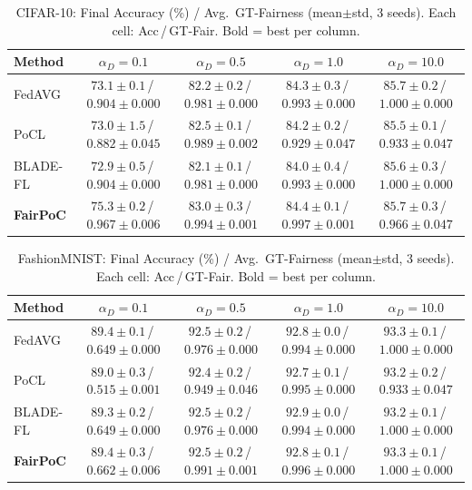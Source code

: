 \documentclass[journal]{IEEEtran}
\theoremstyle{definition}
\theoremstyle{remark}
\begin{document}
\begin{table}[t]
\caption{CIFAR-10: Final Accuracy (\%) / Avg.\ GT-Fairness (mean$\pm$std,
3 seeds). Each cell: Acc\,/\,GT-Fair. Bold = best per column.}
\label{tab:cifar10}
\centering
\renewcommand{\arraystretch}{1.15}
\setlength{\tabcolsep}{3pt}
\footnotesize
\begin{tabular}{lcccc}
\toprule
\textbf{Method} & $\alpha_D{=}0.1$ & $\alpha_D{=}0.5$ & $\alpha_D{=}1.0$ & $\alpha_D{=}10.0$ \\
\midrule
FedAVG   & $73.1{\pm}0.1$\,/\,$0.904{\pm}0.000$ & $82.2{\pm}0.2$\,/\,$0.981{\pm}0.000$ & $84.3{\pm}0.3$\,/\,$0.993{\pm}0.000$ & $\mathbf{85.7{\pm}0.2}$\,/\,$\mathbf{1.000{\pm}0.000}$ \\
PoCL     & $73.0{\pm}1.5$\,/\,$0.882{\pm}0.045$ & $82.5{\pm}0.1$\,/\,$0.989{\pm}0.002$ & $84.2{\pm}0.2$\,/\,$0.929{\pm}0.047$ & $85.5{\pm}0.1$\,/\,$0.933{\pm}0.047$ \\
BLADE-FL & $72.9{\pm}0.5$\,/\,$0.904{\pm}0.000$ & $82.1{\pm}0.1$\,/\,$0.981{\pm}0.000$ & $84.0{\pm}0.4$\,/\,$0.993{\pm}0.000$ & $85.6{\pm}0.3$\,/\,$1.000{\pm}0.000$ \\
\textbf{FairPoC} & $\mathbf{75.3{\pm}0.2}$\,/\,$\mathbf{0.967{\pm}0.006}$ & $\mathbf{83.0{\pm}0.3}$\,/\,$\mathbf{0.994{\pm}0.001}$ & $\mathbf{84.4{\pm}0.1}$\,/\,$\mathbf{0.997{\pm}0.001}$ & $\mathbf{85.7{\pm}0.3}$\,/\,$0.966{\pm}0.047$ \\
\bottomrule
\end{tabular}
\end{table}

\begin{table}[t]
\caption{FashionMNIST: Final Accuracy (\%) / Avg.\ GT-Fairness
(mean$\pm$std, 3 seeds). Each cell: Acc\,/\,GT-Fair. Bold = best per column.}
\label{tab:fashionmnist}
\centering
\renewcommand{\arraystretch}{1.15}
\setlength{\tabcolsep}{3pt}
\footnotesize
\begin{tabular}{lcccc}
\toprule
\textbf{Method} & $\alpha_D{=}0.1$ & $\alpha_D{=}0.5$ & $\alpha_D{=}1.0$ & $\alpha_D{=}10.0$ \\
\midrule
FedAVG   & $89.4{\pm}0.1$\,/\,$0.649{\pm}0.000$ & $92.5{\pm}0.2$\,/\,$0.976{\pm}0.000$ & $92.8{\pm}0.0$\,/\,$0.994{\pm}0.000$ & $\mathbf{93.3{\pm}0.1}$\,/\,$\mathbf{1.000{\pm}0.000}$ \\
PoCL     & $89.0{\pm}0.3$\,/\,$0.515{\pm}0.001$ & $92.4{\pm}0.2$\,/\,$0.949{\pm}0.046$ & $92.7{\pm}0.1$\,/\,$0.995{\pm}0.000$ & $93.2{\pm}0.2$\,/\,$0.933{\pm}0.047$ \\
BLADE-FL & $89.3{\pm}0.2$\,/\,$0.649{\pm}0.000$ & $92.5{\pm}0.2$\,/\,$0.976{\pm}0.000$ & $\mathbf{92.9{\pm}0.0}$\,/\,$0.994{\pm}0.000$ & $93.2{\pm}0.1$\,/\,$1.000{\pm}0.000$ \\
\textbf{FairPoC} & $\mathbf{89.4{\pm}0.3}$\,/\,$\mathbf{0.662{\pm}0.006}$ & $\mathbf{92.5{\pm}0.2}$\,/\,$\mathbf{0.991{\pm}0.001}$ & $92.8{\pm}0.1$\,/\,$\mathbf{0.996{\pm}0.000}$ & $\mathbf{93.3{\pm}0.1}$\,/\,$1.000{\pm}0.000$ \\
\bottomrule
\end{tabular}
\end{table}
\end{document}
